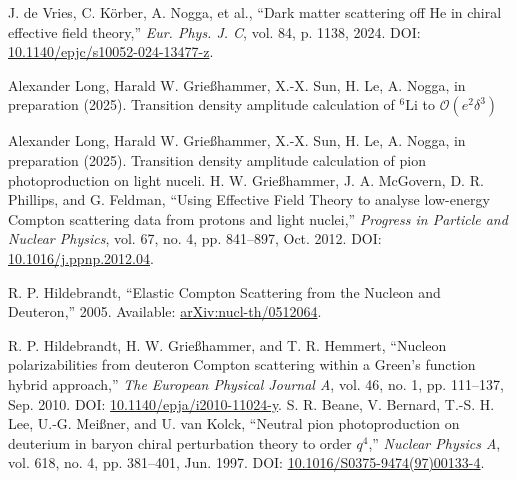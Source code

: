 \documentclass[a4paper,11pt]{article}
\newcommand{\LiS}{{}^{6} \mathrm{Li} }
\begin{document}
\begin{thebibliography}{99}
J. de Vries, C. Körber, A. Nogga, et al., ``Dark matter scattering
off He in chiral effective field theory,'' \textit{Eur. Phys. J.
C}, vol. 84, p. 1138, 2024. DOI:
\href{https://doi.org/10.1140/epjc/s10052-024-13477-z}{10.1140/epjc/s10052-024-13477-z}.

Alexander Long, Harald W. Grie{\ss}hammer, X.-X. Sun, H. Le, A. Nogga,  in preparation (2025). Transition density amplitude calculation of $\LiS$ to $\mathcal{O}(e^2 \delta^3)$

Alexander Long, Harald W. Grie{\ss}hammer, X.-X. Sun, H. Le, A. Nogga,  in preparation (2025). Transition density amplitude calculation of pion photoproduction on light nuceli.
H. W. Grie{\ss}hammer, J. A. McGovern, D. R. Phillips, and G. Feldman, ``Using Effective Field Theory to analyse low-energy Compton scattering data from protons and light nuclei,'' \textit{Progress in Particle and Nuclear Physics}, vol. 67, no. 4, pp. 841–897, Oct. 2012. DOI: \href{http://dx.doi.org/10.1016/j.ppnp.2012.04.003}{10.1016/j.ppnp.2012.04}.

R. P. Hildebrandt, ``Elastic Compton Scattering from the Nucleon and Deuteron,'' 2005. Available: \href{https://arxiv.org/abs/nucl-th/0512064}{arXiv:nucl-th/0512064}.

R. P. Hildebrandt, H. W. Grießhammer, and T. R. Hemmert, ``Nucleon polarizabilities from deuteron Compton scattering within a Green’s function hybrid approach,'' \textit{The European Physical Journal A}, vol. 46, no. 1, pp. 111–137, Sep. 2010. DOI: \href{http://dx.doi.org/10.1140/epja/i2010-11024-y}{10.1140/epja/i2010-11024-y}.
S. R. Beane, V. Bernard, T.-S. H. Lee, U.-G. Meißner, and U. van Kolck, ``Neutral pion photoproduction on deuterium in baryon chiral perturbation theory to order $q^4$,'' \textit{Nuclear Physics A}, vol. 618, no. 4, pp. 381–401, Jun. 1997. DOI: \href{http://dx.doi.org/10.1016/S0375-9474(97)00133-4}{10.1016/S0375-9474(97)00133-4}.
\end{thebibliography}
\end{document}
